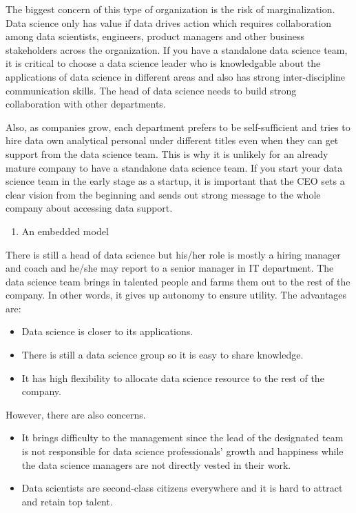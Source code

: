 \documentclass[12pt,]{krantz}
\providecommand{\tightlist}{%
  \setlength{\itemsep}{0pt}\setlength{\parskip}{0pt}}
\theoremstyle{definition}
\theoremstyle{definition}
\theoremstyle{definition}
\theoremstyle{remark}
\begin{document}
The biggest concern of this type of organization is the risk of
marginalization. Data science only has value if data drives action which
requires collaboration among data scientists, engineers, product
managers and other business stakeholders across the organization. If you
have a standalone data science team, it is critical to choose a data
science leader who is knowledgable about the applications of data
science in different areas and also has strong inter-discipline
communication skills. The head of data science needs to build strong
collaboration with other departments.

Also, as companies grow, each department prefers to be self-sufficient
and tries to hire data own analytical personal under different titles
even when they can get support from the data science team. This is why
it is unlikely for an already mature company to have a standalone data
science team. If you start your data science team in the early stage as
a startup, it is important that the CEO sets a clear vision from the
beginning and sends out strong message to the whole company about
accessing data support.

\begin{enumerate}
\def\labelenumi{(\arabic{enumi})}
\setcounter{enumi}{1}
\tightlist
\item
  An embedded model
\end{enumerate}

There is still a head of data science but his/her role is mostly a
hiring manager and coach and he/she may report to a senior manager in IT
department. The data science team brings in talented people and farms
them out to the rest of the company. In other words, it gives up
autonomy to ensure utility. The advantages are:

\begin{itemize}
\tightlist
\item
  Data science is closer to its applications.
\item
  There is still a data science group so it is easy to share knowledge.
\item
  It has high flexibility to allocate data science resource to the rest
  of the company.
\end{itemize}

However, there are also concerns.

\begin{itemize}
\tightlist
\item
  It brings difficulty to the management since the lead of the
  designated team is not responsible for data science professionals'
  growth and happiness while the data science managers are not directly
  vested in their work.
\item
  Data scientists are second-class citizens everywhere and it is hard to
  attract and retain top talent.
\end{itemize}
\end{document}
